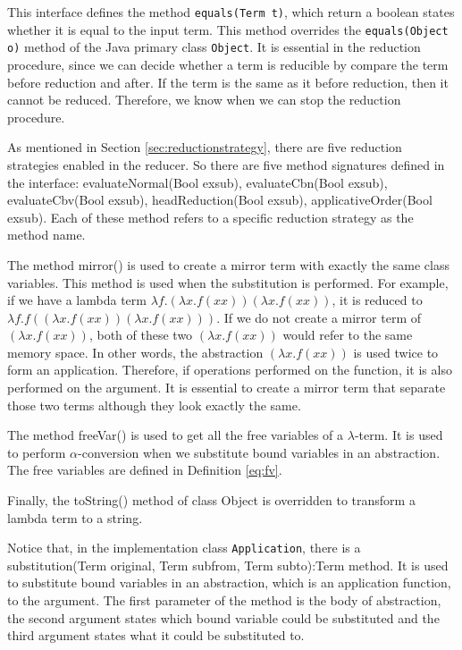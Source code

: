 This interface defines the method \verb|equals(Term t)|, which return a boolean states whether it is equal to the input term. This method overrides the \verb|equals(Object o)| method of the Java primary class \verb|Object|. It is essential in the reduction procedure, since we can decide whether a term is reducible by compare the term before reduction and after. If the term is the same as it before reduction, then it cannot be reduced. Therefore, we know when we can stop the reduction procedure.  

As mentioned in Section \ref{sec:reductionstrategy}, there are five reduction strategies enabled in the reducer. So there are five method signatures defined in the interface: \textsf{evaluateNormal(Bool exsub), evaluateCbn(Bool exsub), evaluateCbv(Bool exsub), headReduction(Bool exsub), applicativeOrder(Bool exsub)}. Each of these method refers to a specific reduction strategy as the method name. 

The method \textsf{mirror()} is used to create a mirror term with exactly the same class variables. This method is used when the substitution is performed. For example, if we have a lambda term $\lambda f.(\lambda x.f(xx))(\lambda x.f(xx))$, it is reduced to $\lambda f.f((\lambda x.f(xx))(\lambda x.f(xx)))$. If we do not create a mirror term of $(\lambda x.f(xx))$, both of these two $(\lambda x.f(xx))$ would refer to the same memory space. In other words, the abstraction $(\lambda x.f(xx))$ is used twice to form an application. Therefore, if operations performed on the function, it is also performed on the argument. It is essential to create a mirror term that separate those two terms although they look exactly the same.

The method \textsf{freeVar()} is used to get all the free variables of a $\lambda$-term. It is used to perform $\alpha$-conversion when we substitute bound variables in an abstraction. The free variables are defined in Definition \ref{eq:fv}.       

Finally, the \textsf{toString()} method of class \textsf{Object} is overridden to transform a lambda term to a string. 

Notice that, in the implementation class \verb|Application|, there is a \textsf{substitution(Term original, Term subfrom, Term subto):Term} method. It is used to substitute bound variables in an abstraction, which is an application function, to the argument. The first parameter of the method is the body of abstraction, the second argument states which bound variable could be substituted and the third argument states what it could be substituted to.

